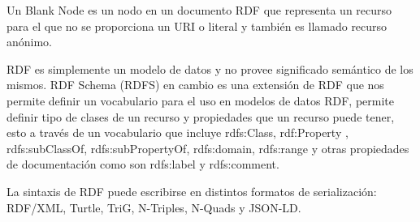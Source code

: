 Un Blank Node es un nodo en un documento RDF que representa un recurso para el que no se proporciona un URI o literal y también es llamado recurso anónimo.

RDF es simplemente un modelo de datos y no provee significado semántico de los mismos. RDF Schema (RDFS) en cambio es una extensión de RDF que nos permite definir un vocabulario para el uso en modelos de datos RDF, permite definir tipo de clases de un recurso y propiedades que un recurso puede tener, esto a través de un vocabulario que incluye rdfs:Class, rdf:Property , rdfs:subClassOf, rdfs:subPropertyOf, rdfs:domain, rdfs:range y otras propiedades de documentación como son rdfs:label y rdfs:comment.

La sintaxis de RDF puede escribirse en distintos formatos de serialización: RDF/XML, Turtle, TriG, N-Triples, N-Quads y JSON-LD.


